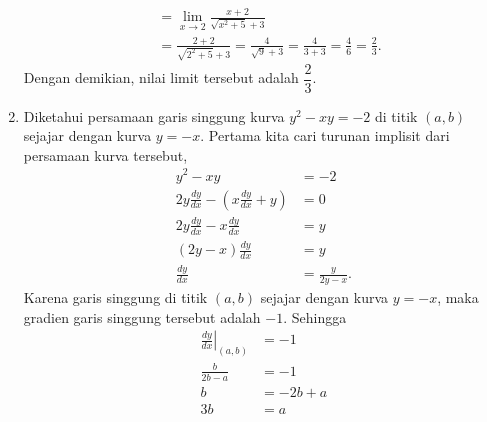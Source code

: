 \documentclass[11pt,openany,a4paper]{article}
\begin{document}
\begin{enumerate}
\begin{align*}
                                                              & = \lim_{x \to 2} \frac{x + 2}{\sqrt{x^2 + 5} + 3}                                                                                                                                                                                                                                                                                                                              \\
                                                              & = \frac{2 + 2}{\sqrt{2^2 + 5} + 3}                                                             = \frac{4}{\sqrt{9} + 3}                                                             = \frac{4}{3 + 3}                                                                     = \frac{4}{6}                                                                         = \frac{2}{3}.
          \end{align*}
          Dengan demikian, nilai limit tersebut adalah $\dfrac{2}{3}$.
    \item Diketahui persamaan garis singgung kurva $y^2 - xy = -2$ di titik $(a,b)$ sejajar dengan kurva $y = -x$. Pertama kita cari turunan implisit dari persamaan kurva tersebut,
          \begin{align*}
              y^2 - xy                                              & = -2                \\
              2y \frac{dy}{dx} - \left( x \frac{dy}{dx} + y \right) & = 0                 \\
              2y \frac{dy}{dx} - x \frac{dy}{dx}                    & = y                 \\
              (2y - x) \frac{dy}{dx}                                & = y                 \\
              \frac{dy}{dx}                                         & = \frac{y}{2y - x}.
          \end{align*}
          Karena garis singgung di titik $(a,b)$ sejajar dengan kurva $y = -x$, maka gradien garis singgung tersebut adalah $-1$. Sehingga
          \begin{align*}
              \left. \frac{dy}{dx} \right|_{(a,b)} & = -1      \\
              \frac{b}{2b - a}                     & = -1      \\
              b                                    & = -2b + a \\
              3b                                   & = a       \\

\end{align*}
\end{enumerate}
\end{document}
